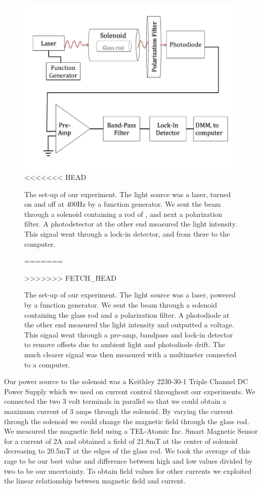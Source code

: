 \documentclass[prb,preprint]{revtex4-1}
\begin{document}
\begin{figure}[h!]
\centering
\includegraphics[width=6in]{Faraday_lab_set-up.pdf}
<<<<<<< HEAD
\caption{The set-up of our experiment. The light source was a laser, turned on and off at 400Hz by a function generator. We sent the beam through a solenoid containing a rod of , and next a polarization filter. A photodetector at the other end measured the light intensity. This signal went through a  lock-in detector, and from there to the computer.}
=======
\caption{The set-up of our experiment. The light source was a laser, powered by a function generator. We sent the beam through a solenoid containing the glass rod and a polarization filter. A photodiode at the other end measured the light intensity and outputted a voltage. This signal went through a pre-amp, bandpass and lock-in detector to remove offsets due to ambient light and photodiode drift. The much clearer signal was then measured with a multimeter connected to a computer.}
>>>>>>> FETCH_HEAD
\label{set-up}
\end{figure}


Our power source to the solenoid was a Keithley 2230-30-1 Triple Channel DC Power Supply which we used on current control throughout our experiments. We connected the two 3 volt terminals in parallel so that we could obtain a maximum current of 3 amps through the solenoid. By varying the current through the solenoid we could change the magnetic field through the glass rod. We measured the magnetic field using a TEL-Atomic Inc. Smart Magnetic Sensor for a current of 2A and obtained a field of 21.8mT at the center of solenoid decreasing to 20.5mT at the edges of the glass rod. We took the average of this rage to be our best value and difference between high and low values divided by two to be our uncertainty. To obtain field values for other currents we exploited the linear relationship between magnetic field and current.
\end{document}
